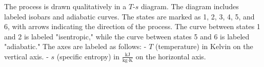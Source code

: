 The process is drawn qualitatively in a \( T \)-\( s \) diagram. The diagram includes labeled isobars and adiabatic curves. The states are marked as 1, 2, 3, 4, 5, and 6, with arrows indicating the direction of the process. The curve between states 1 and 2 is labeled "isentropic," while the curve between states 5 and 6 is labeled "adiabatic." The axes are labeled as follows:  
- \( T \) (temperature) in Kelvin on the vertical axis.  
- \( s \) (specific entropy) in \( \frac{\text{kJ}}{\text{kg·K}} \) on the horizontal axis.